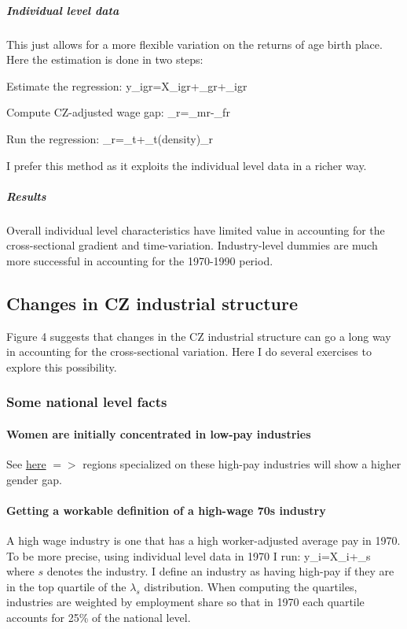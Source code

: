 \subparagraph{Individual level data}
This just allows for a more flexible variation on the returns of age birth place. Here the estimation is done in two steps:
\benu
	\item Estimate the regression:
	\beqn
		y_{igr}=X_{igr}\gamma+\lambda_{gr}+\varepsilon_{igr}
	\eeqn
	\item Compute CZ-adjusted wage gap:
	\beqns
		\tau_r=\lambda_{mr}-\lambda_{fr}
	\eeqns
	\item Run the regression:
	\beqns
	\tau_r=\alpha_t+\beta_t\log(density)_r
	\eeqns
\eenu

I prefer this method as it exploits the individual level data in a richer way.


\subparagraph{Results} 
 Overall individual level characteristics have limited value in accounting for the cross-sectional gradient and time-variation. Industry-level dummies are much more successful in accounting for the 1970-1990 period.


\FloatBarrier

\FloatBarrier



\subsection{Changes in CZ industrial structure}
Figure 4 suggests that changes in the CZ industrial structure can go a long way in accounting for the cross-sectional variation. Here I do several exercises to explore this possibility.

\subsubsection{Some national level facts}
\paragraph{Women are initially concentrated in low-pay industries}
See \href{https://www.dropbox.com/s/lfpo3q5i9mvq8ry/employment_distribution_gender_full_time.png?dl=0}{here} $=> $ regions specialized on these high-pay industries will show a higher gender gap.


\paragraph{Getting a workable definition of a high-wage 70s industry}
A high wage industry is one that has a high worker-adjusted average pay in 1970. To be more precise, using individual level data in 1970 I run:
\beqn
y_{i}=X_{i}\beta+\lambda_{s}
\eeqn
where $s$ denotes the industry.  I define an industry as having high-pay if they are in the top quartile of the $\lambda_{s}$ distribution. When computing the quartiles, industries are weighted by employment share so that in 1970 each quartile accounts for 25\% of the national level.

